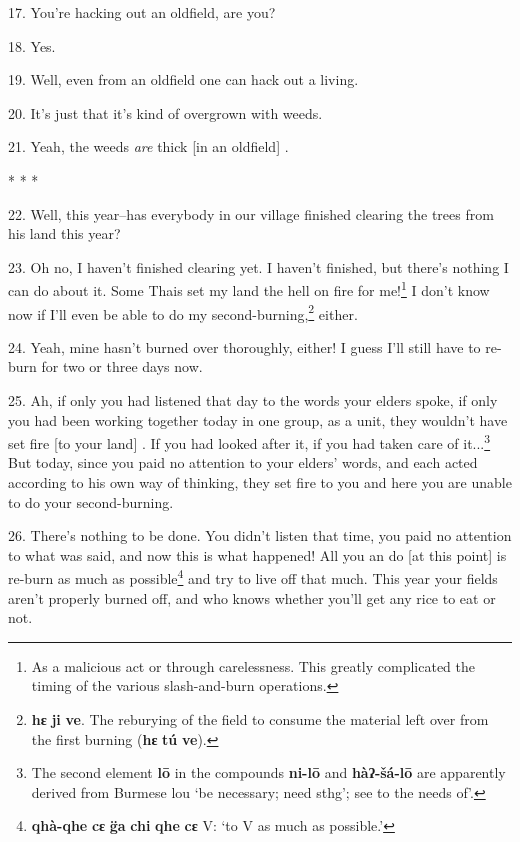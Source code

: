 17. You're hacking out an oldfield, are you?

18. Yes.

19. Well, even from an oldfield one can hack out a living.

20. It's just that it's kind of overgrown with weeds.

21. Yeah, the weeds \textit{are} thick [in an oldfield] .

\begin{center}
* * *
\end{center}

22. Well, this year--has everybody in our village finished clearing the trees from
his land this year?

23. Oh no, I haven't finished clearing yet. I haven't finished, but there's nothing
I can do about it. Some Thais set my land the hell on fire for me!\footnote{As a malicious act or through carelessness. This greatly complicated the timing of the various slash-and-burn operations.} I don't
know now if I'll even be able to do my second-burning,\footnote{\textbf{hɛ} \textbf{ji} \textbf{ve}. The reburying of the field to consume the material left over from the first burning (\textbf{hɛ} \textbf{tú} \textbf{ve}).} either.

24. Yeah, mine hasn't burned over thoroughly, either! I guess I'll still have to
re-burn for two or three days now.

25. Ah, if only you had listened that day to the words your elders spoke, if only
you had been working together today in one group, as a unit, they wouldn't have
set fire [to your land] . If you had looked after it, if you had taken care of
it...\footnote{The second element \textbf{lō} in the compounds \textbf{ni-lō} and \textbf{hàʔ-šá-lō} are apparently derived from Burmese lou `be necessary; need sthg'; see to the needs of'.} But today, since you paid no attention to your elders' words, and each
acted according to his own way of thinking, they set fire to you and here you are
unable to do your second-burning.

26. There's nothing to be done. You didn't listen that time, you paid no attention
to what was said, and now this is what happened! All you an do [at this point]
is re-burn as much as possible\footnote{\textbf{qhà-qhe} \textbf{cɛ} \textbf{g̈a} \textbf{chi} \textbf{qhe} \textbf{cɛ} V: `to V as much as possible.'} and try to live off that much. This year your
fields aren't properly burned off, and who knows whether you'll get any rice to
eat or not.

